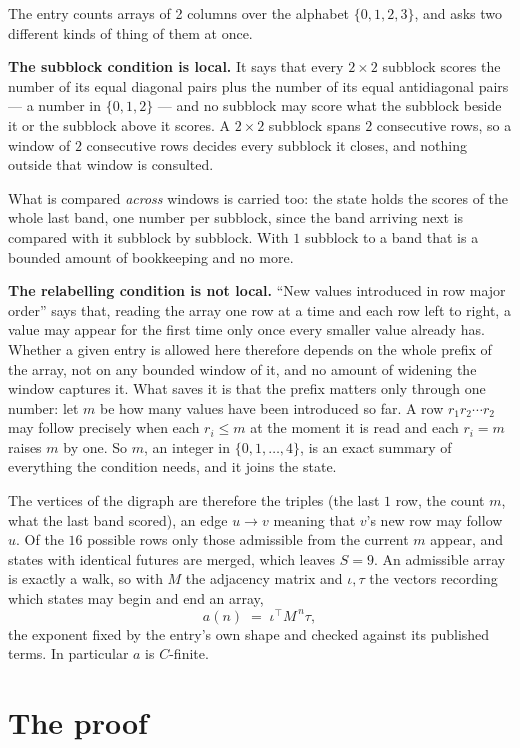 \documentclass[11pt,a4paper]{article}
\theoremstyle{plain}
\theoremstyle{definition}
\begin{document}
The entry counts arrays of 2 columns over the alphabet $\{0,1,2,3\}$, and asks two different kinds of thing of them at once.

\textbf{The subblock condition is local.} It says that every $2\times2$ subblock scores the number of its equal diagonal pairs plus the number of its equal antidiagonal pairs --- a number in $\{0,1,2\}$ --- and no subblock may score what the subblock beside it or the subblock above it scores. A $ 2\times2$ subblock spans $2$ consecutive rows, so a window of $2$ consecutive rows decides every subblock it closes, and nothing outside that window is consulted.

What is compared \emph{across} windows is carried too: the state holds the scores of the whole last band, one number per subblock, since the band arriving next is compared with it subblock by subblock. With $1$ subblock to a band that is a bounded amount of bookkeeping and no more.

\textbf{The relabelling condition is not local.} ``New values introduced in row major order'' says that, reading the array one row at a time and each row left to right, a value may appear for the first time only once every smaller value already has. Whether a given entry is allowed here therefore depends on the whole prefix of the array, not on any bounded window of it, and no amount of widening the window captures it. What saves it is that the prefix matters only through one number: let $m$ be how many values have been introduced so far. A row $r_1r_2\cdots r_2$ may follow precisely when each $r_i\le m$ at the moment it is read and each $r_i=m$ raises $m$ by one. So $m$, an integer in $\{0,1,\dots,4\}$, is an exact summary of everything the condition needs, and it joins the state.

The vertices of the digraph are therefore the triples (the last $1$ row, the count $m$, what the last band scored), an edge $u\to v$ meaning that $v$'s new row may follow $u$. Of the $16$ possible rows only those admissible from the current $m$ appear, and states with identical futures are merged, which leaves $S=9$. An admissible array is exactly a walk, so with $M$ the adjacency matrix and $\iota,\tau$ the vectors recording which states may begin and end an array,
\[
a(n)\;=\;\iota^{\!\top}M^{\,n}\tau ,
\]
the exponent fixed by the entry's own shape and checked against its published terms. In
particular $a$ is $C$-finite.

\section{The proof}
\end{document}
